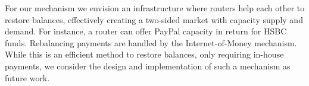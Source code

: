 For our mechanism we envision an infrastructure where routers help each other to restore balances, effectively creating a two-sided market with capacity supply and demand.
For instance, a router can offer PayPal capacity in return for HSBC funds.
Rebalancing payments are handled by the Internet-of-Money mechanism.
While this is an efficient method to restore balances, only requiring in-house payments, we consider the design and implementation of such a mechanism as future work.


\label{sec:switch_validation}


